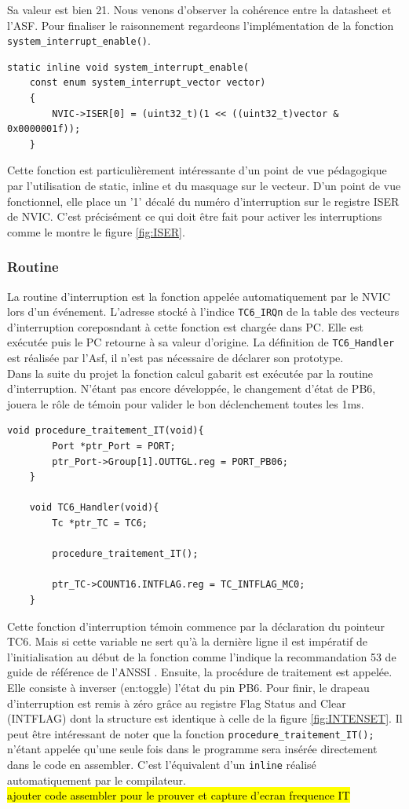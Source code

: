 \documentclass[a4paper]{article}
\begin{document}
	Sa valeur est bien 21. Nous venons d'observer la cohérence entre la datasheet et l'ASF. Pour finaliser le raisonnement regardeons l'implémentation de la fonction \texttt{system\_interrupt\_enable()}.
	\begin{lstlisting}[style=CStyle]
	static inline void system_interrupt_enable(
	const enum system_interrupt_vector vector)
	{
		NVIC->ISER[0] = (uint32_t)(1 << ((uint32_t)vector & 0x0000001f));
	}\end{lstlisting}
	Cette fonction est particulièrement intéressante d'un point de vue pédagogique par l'utilisation de static, inline et du masquage sur le vecteur. D'un point de vue fonctionnel, elle place un '1' décalé du numéro d'interruption sur le registre ISER de NVIC. C'est précisément ce qui doit être fait pour activer les interruptions comme le montre le figure \ref{fig:ISER}.
	
	\subsubsection{Routine}
	La routine d'interruption est la fonction appelée automatiquement par le NVIC lors d'un événement. L'adresse stocké à l'indice \texttt{TC6\_IRQn} de la table des vecteurs d'interruption coreposndant à cette fonction est chargée dans PC. Elle est exécutée puis le PC retourne à sa valeur d'origine. La définition de \texttt{TC6\_Handler} est réalisée par l'Asf, il n'est pas nécessaire de déclarer son prototype. \\
	Dans la suite du projet la fonction calcul gabarit est exécutée par la routine d'interruption. N'étant pas encore développée, le changement d'état de PB6, jouera le rôle de témoin pour valider le bon déclenchement toutes les 1ms.
	\begin{lstlisting}[style=CStyle]
	void procedure_traitement_IT(void){
		Port *ptr_Port = PORT;
		ptr_Port->Group[1].OUTTGL.reg = PORT_PB06;
	}
	
	void TC6_Handler(void){
		Tc *ptr_TC = TC6;
				
		procedure_traitement_IT();
		
		ptr_TC->COUNT16.INTFLAG.reg = TC_INTFLAG_MC0;
	}
	\end{lstlisting}
	Cette fonction d'interruption témoin commence par la déclaration du pointeur TC6. Mais si cette variable ne sert qu'à la dernière ligne il est impératif de l'initialisation au début de la fonction comme l'indique la recommandation 53 de guide de référence de l'ANSSI \cite{ANSSI2021}. Ensuite, la procédure de traitement est appelée. Elle consiste à inverser (en:toggle) l'état du pin PB6. Pour finir, le drapeau d'interruption est remis à zéro grâce au registre Flag Status and Clear
	(INTFLAG) dont la structure est identique à celle de la figure \ref{fig:INTENSET}. Il peut être intéressant de noter que la fonction \texttt{procedure\_traitement\_IT();} n'étant appelée qu'une seule fois dans le programme sera insérée directement dans le code en assembler. C'est l'équivalent d'un \texttt{inline} réalisé automatiquement par le compilateur.
	\\
	\hl{ajouter code assembler pour le prouver et capture d'ecran frequence IT}\\
	\newline
	\indent
	
\end{document}
